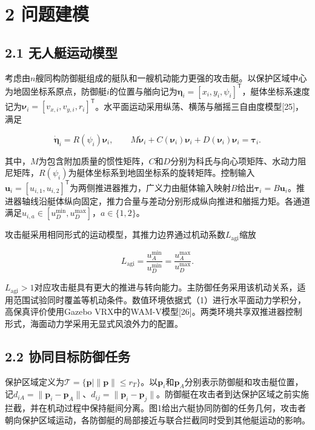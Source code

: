 \documentclass[UTF8,10.5pt,a4paper,fontset=none]{ctexart}
\begin{document}
\section{2 问题建模}\label{ux95eeux9898ux5efaux6a21}

\subsection{2.1
无人艇运动模型}\label{ux65e0ux4ebaux8247ux8fd0ux52a8ux6a21ux578b}

考虑由\(n\)艘同构防御艇组成的艇队和一艘机动能力更强的攻击艇。以保护区域中心为地固坐标系原点，防御艇\(i\)的位置与艏向记为\(\boldsymbol\eta_i=[x_i,y_i,\psi_i]^{\mathsf T}\)，艇体坐标系速度记为\(\boldsymbol\nu_i=[v_{x,i},v_{y,i},r_i]^{\mathsf T}\)。水平面运动采用纵荡、横荡与艏摇三自由度模型{[}25{]}，满足

\[
\dot{\boldsymbol\eta}_i=R(\psi_i)\boldsymbol\nu_i,
\qquad
M\dot{\boldsymbol\nu}_i+C(\boldsymbol\nu_i)\boldsymbol\nu_i+D(\boldsymbol\nu_i)\boldsymbol\nu_i=\boldsymbol\tau_i.
\tag{1}
\]

其中，\(M\)为包含附加质量的惯性矩阵，\(C\)和\(D\)分别为科氏与向心项矩阵、水动力阻尼矩阵，\(R(\psi_i)\)为艇体坐标系到地固坐标系的旋转矩阵。控制输入\(\boldsymbol u_i=[u_{i,1},u_{i,2}]^{\mathsf T}\)为两侧推进器推力，广义力由艇体输入映射\(B\)给出\(\boldsymbol\tau_i=B\boldsymbol u_i\)。推进器轴线沿艇体纵向固定，推力合量与差动分别形成纵向推进和艏摇力矩。各通道满足\(u_{i,a}\in[u_D^{\min},u_D^{\max}]\)，\(a\in\{1,2\}\)。

攻击艇采用相同形式的运动模型，其推力边界通过机动系数\(L_{\mathrm{agi}}\)缩放

\[
L_{\mathrm{agi}}=
\frac{u_A^{\min}}{u_D^{\min}}
=
\frac{u_A^{\max}}{u_D^{\max}}.
\tag{2}
\]

\(L_{\mathrm{agi}}>1\)对应攻击艇具有更大的推进与转向能力。主防御任务采用该机动关系，适用范围试验同时覆盖等机动条件。数值环境依据式（1）进行水平面动力学积分，高保真评价使用Gazebo
VRX中的WAM-V模型{[}26{]}。两类环境共享双推进器控制形式，海面动力学采用无显式风浪外力的配置。

\subsection{2.2
协同目标防御任务}\label{ux534fux540cux76eeux6807ux9632ux5fa1ux4efbux52a1}

保护区域定义为\(\mathcal T=\{\boldsymbol p\mid\|\boldsymbol p\|\le r_T\}\)。以\(\boldsymbol p_i\)和\(\boldsymbol p_A\)分别表示防御艇和攻击艇位置，记\(d_{iA}=\|\boldsymbol p_i-\boldsymbol p_A\|\)、\(d_{ij}=\|\boldsymbol p_i-\boldsymbol p_j\|\)。防御艇在攻击者到达保护区域之前实施拦截，并在机动过程中保持艇间分离。图1给出六艇协同防御的任务几何，攻击者朝向保护区域运动，各防御艇的局部接近与联合拦截同时受到其他艇运动的影响。
\end{document}
